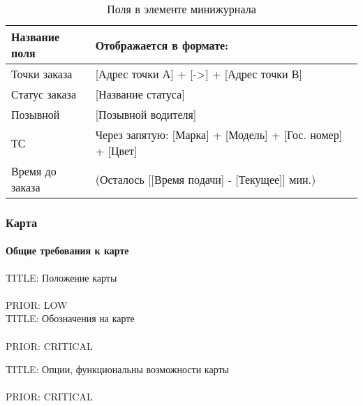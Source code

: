 		    \begin{table} [h]
	            \begin{center}
	            \caption {Поля в элементе минижурнала}
	            \label{fields_element_minijournal}
	            \setlength{\extrarowheight}{2mm}
	            \begin{tabular}{|p{5cm}|p{10cm}|}
	               \hline     \textbf{Название поля}&\textbf{Отображается в формате:} \\ [2mm]

	               \hline Точки заказа  & [Адрес точки А] + [->] + [Адрес точки В]\\ [2mm]
	               \hline Статус заказа  & [Название статуса]\\ [2mm]
	               \hline Позывной    & [Позывной водителя]\\ [2mm]
	               \hline ТС & Через запятую: [Марка] + [Модель] + [Гос. номер] + [Цвет]\\ [2mm]
	               \hline Время до заказа  & (Осталось [[Время подачи] - [Текущее]] мин.)\\ [2mm]

	               \hline
	            \end{tabular}
	            \end{center}
            \end{table}


		\subsubsection{Карта}

			\paragraph{Общие требования к карте}	

				TITLE: Положение карты\\
				\\ 
				PRIOR: LOW\\

				TITLE: Обозначения на карте\\
				\\ 
				PRIOR: CRITICAL

				TITLE: Опции, функциональны возможности карты\\
				\\ 
				PRIOR: CRITICAL

